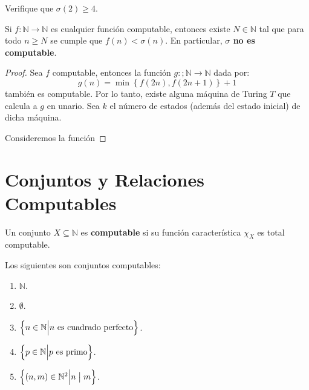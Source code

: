 \documentclass[12pt]{report}
\newcounter{it}
\theoremstyle{largebreak}
\newcommand\divides{\ensuremath{\bigm|}}
\newcommand\cf[3]{\ensuremath{#1:#2\rightarrow#3}}
\begin{document}
    \begin{excer}
        Verifique que $\sigma(2)\geq4$.
    \end{excer}

    \begin{theor}
        Si $\cf{f}{\mathbb{N}}{\mathbb{N}}$ es cualquier función computable, entonces existe $N\in\mathbb{N}$ tal que para todo $n\geq N$ se cumple que $f(n)< \sigma(n)$. En particular, \textbf{$\sigma$ no es computable}.
    \end{theor}

    \begin{proof}
        Sea $f$ computable, entonces la función $\cf{g}{;\mathbb{N}}{\mathbb{N}}$ dada por:
        \begin{equation*}
            g(n)=\min\left\{f(2n),f(2n+1) \right\}+1
        \end{equation*}
        también es computable. Por lo tanto, existe alguna máquina de Turing $T$ que calcula a $g$ en unario. Sea $k$ el número de estados (además del estado inicial) de dicha máquina.

        Consideremos la función 
    \end{proof}

    \section{Conjuntos y Relaciones Computables}

    \begin{mydef}
        Un conjunto $X\subseteq\mathbb{N}$ es \textbf{computable} si su función característica $\chi_X$ es total computable.
    \end{mydef}

    \begin{exa}
        Los siguientes son conjuntos computables:
        \begin{enumerate}[label = \textit{(\arabic*)}]
            \item $\mathbb{N}$.
            \item $\emptyset$.
            \item $\left\{n\in\mathbb{N}\Big|n\textup{ es cuadrado perfecto} \right\}$.
            \item $\left\{p\in\mathbb{N}\Big|p\textup{ es primo} \right\}$.
            \item $\left\{(n,m)\in\mathbb{N}^2\Big|n\divides m \right\}$.
        \end{enumerate}
    \end{exa}
\end{document}
